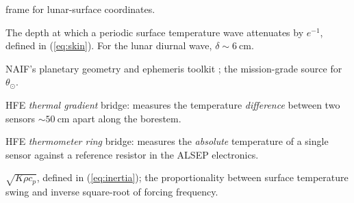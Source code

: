 \documentclass[11pt]{report}
\begin{document}
\begin{description}
        frame for lunar-surface coordinates.
  \item[Skin depth $\delta$] The depth at which a periodic surface
        temperature wave attenuates by $e^{-1}$, defined in
        (\ref{eq:skin}). For the lunar diurnal wave,
        $\delta\sim\SI{6}{\centi\meter}$.
  \item[SPICE] NAIF's planetary geometry and ephemeris toolkit
        \citep{acton1996,acton2018}; the mission-grade source for $\theta_\odot$.
  \item[TG bridge] HFE \emph{thermal gradient} bridge: measures the
        temperature \emph{difference} between two sensors $\sim\!\SI{50}{\centi\meter}$
        apart along the borestem.
  \item[TR bridge] HFE \emph{thermometer ring} bridge: measures the
        \emph{absolute} temperature of a single sensor against a
        reference resistor in the ALSEP electronics.
  \item[Thermal inertia $I$] $\sqrt{K\rho c_p}$, defined in
        (\ref{eq:inertia}); the proportionality between surface
        temperature swing and inverse square-root of forcing frequency.
\end{description}


\end{document}
